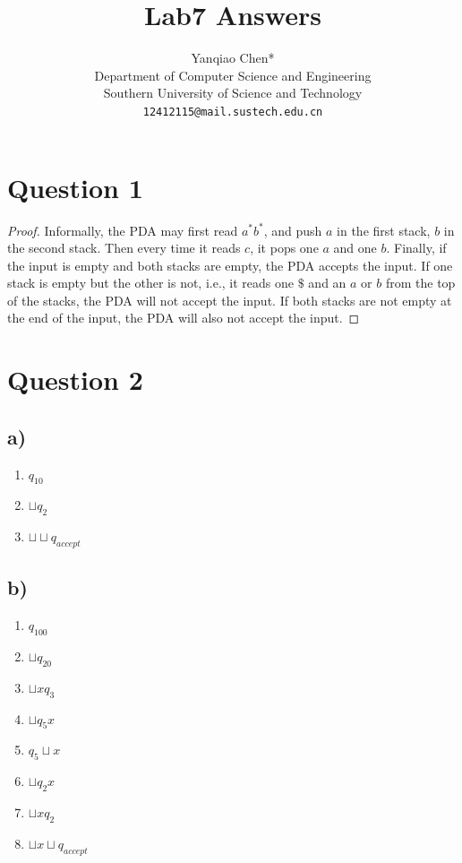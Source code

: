 \documentclass[a4paper, UTF-8]{article}
\theoremstyle{plain}
\begin{document}
\title{\bf{Lab7 Answers}}

\author{Yanqiao Chen*\\ 
  Department of Computer Science and Engineering\\
  Southern University of Science and Technology\\
  \texttt{12412115@mail.sustech.edu.cn}
  }

\maketitle

\section{Question 1} 

\begin{proof} 

Informally, the PDA may first read $a^*b^*$, and push $a$ in the first stack, $b$ in the second stack. Then every time it reads $c$, it pops one $a$ and one $b$. Finally, if the input is empty and both stacks are empty, the PDA accepts the input. If one stack is empty but the other is not, i.e., it reads one $\mathdollar$ and an $a$ or $b$ from the top of the stacks, the PDA will not accept the input. If both stacks are not empty at the end of the input, the PDA will also not accept the input.

\end{proof}

\section{Question 2}

\subsection{a)} 

\begin{enumerate}
    \item $q_10$ 
    \item $\sqcup q_2$
    \item $\sqcup \sqcup q_{accept}$
\end{enumerate}

\subsection{b)} 

\begin{enumerate}
    \item $q_100$ 
    \item $\sqcup q_20$
    \item $\sqcup x q_{3}$
    \item $\sqcup q_5 x$ 
    \item $q_5 \sqcup x$
    \item $\sqcup q_2 x$ 
    \item $\sqcup x q_2$ 
    \item $\sqcup x \sqcup q_{accept}$
\end{enumerate}
\end{document}
